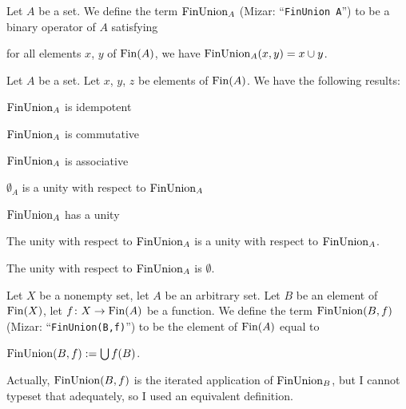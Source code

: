 \documentclass{article}
\begin{document}
\begin{definition}
Let $A$ be a set.
We define the term $\operatorname{FinUnion}_{A}$ (Mizar: ``\verb#FinUnion A#'') to be
a binary operator of $A$ satisfying
\begin{defn}
\item for all elements $x$, $y$ of $\operatorname{Fin}(A)$, we have
  $\operatorname{FinUnion}_{A}(x,y)=x\cup y$.
\end{defn}
\end{definition}

Let $A$ be a set. Let $x$, $y$, $z$ be elements of $\operatorname{Fin}(A)$. We have
the following results:
\begin{thm}
\item\label{setwiseo:37} $\operatorname{FinUnion}_{A}$ is idempotent
\item\label{setwiseo:38} $\operatorname{FinUnion}_{A}$ is commutative
\item\label{setwiseo:39} $\operatorname{FinUnion}_{A}$ is associative
\item\label{setwiseo:40} $\emptyset_{A}$ is a unity with respect to $\operatorname{FinUnion}_{A}$
\item\label{setwiseo:41} $\operatorname{FinUnion}_{A}$ has a unity
\item\label{setwiseo:42} The unity with respect to $\operatorname{FinUnion}_{A}$ is a
  unity with respect to $\operatorname{FinUnion}_{A}$.
\item\label{setwiseo:43} The unity with respect to $\operatorname{FinUnion}_{A}$ is $\emptyset$.
\end{thm}

\begin{definition}
Let $X$ be a nonempty set, let $A$ be an arbitrary set.
Let $B$ be an element of $\operatorname{Fin}(X)$, let $f\colon X\to\operatorname{Fin}(A)$ be a function.
We define the term $\operatorname{FinUnion}(B,f)$ (Mizar: ``\verb#FinUnion(B,f)#'') to
be the element of $\operatorname{Fin}(A)$ equal to
\begin{defn}
\item $\operatorname{FinUnion}(B,f) := \bigcup f(B)$.
\end{defn}
\end{definition}
\begin{remark}
Actually, $\operatorname{FinUnion}(B,f)$ is the iterated application of
$\operatorname{FinUnion}_{B}$, but I cannot typeset that adequately, so I used an
equivalent definition.
\end{remark}
\end{document}
